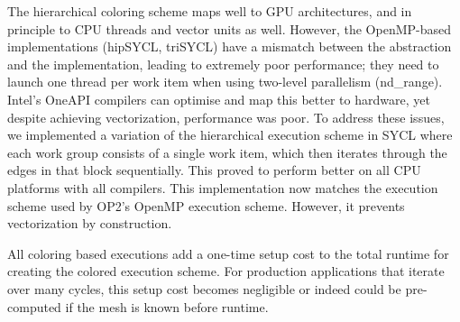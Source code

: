 \documentclass[runningheads]{llncs}
\begin{document}
The hierarchical coloring scheme maps well to GPU architectures, and in 
principle to CPU threads and vector units as well. However, the OpenMP-based 
implementations (hipSYCL, triSYCL) have a mismatch between the abstraction and 
the implementation, leading to extremely poor performance; they need to launch 
one thread per work item when using two-level parallelism (nd\_range). Intel's 
OneAPI compilers can optimise and map this better to hardware, yet despite 
achieving vectorization, performance was poor. To address these issues, we 
implemented a variation of the hierarchical execution scheme in SYCL where each 
work group consists of a single work item, which then iterates through the edges 
in that block sequentially. This proved to perform better on all CPU platforms 
with all compilers. This implementation now matches the execution scheme used by 
OP2's OpenMP execution scheme. However, it prevents vectorization by 
construction.

All coloring based executions add a one-time setup cost to the total runtime 
for creating the colored execution scheme. For production applications that 
iterate over many cycles, this setup cost becomes negligible or indeed could 
be pre-computed if the mesh is known before runtime. 


\end{document}

